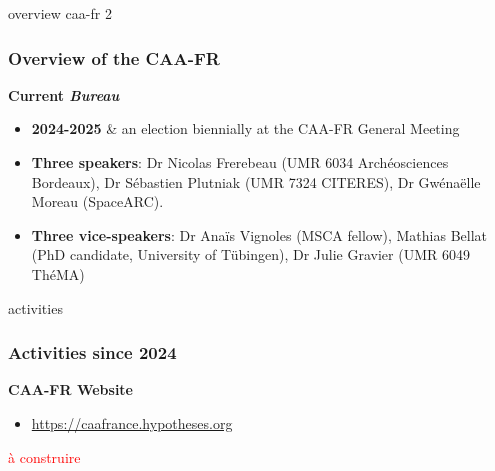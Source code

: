 \documentclass[t,aspectratio=169,xcolor=dvipsnames]{beamer}
\begin{document}
    \begin{frame}{overview caa-fr 2}

    \frametitle{Overview of the CAA-FR} 
        \begin{block}{\textbf{Current \textit{Bureau}}}
       
        \begin{itemize}
            \item \textbf{2024-2025} \& an election biennially at the CAA-FR General Meeting
            \item \textbf{Three speakers}: Dr Nicolas Frerebeau (UMR 6034 Archéosciences Bordeaux), Dr Sébastien Plutniak (UMR 7324 CITERES), Dr Gwénaëlle Moreau (SpaceARC).%
            \item \textbf{Three vice-speakers}: Dr Anaïs Vignoles (MSCA fellow), Mathias Bellat (PhD candidate, University of Tübingen), Dr Julie Gravier (UMR 6049 ThéMA)
        \end{itemize}

    \end{block}
    
    \end{frame}


\begin{frame}{activities}
	
	\frametitle{Activities since 2024}
	
	\begin{block}{\textbf{CAA-FR Website}}
		
		\begin{itemize}
			\item \href{https://caafrance.hypotheses.org}{https://caafrance.hypotheses.org}
		\end{itemize}
		
	\end{block}
	
	\textcolor{red}{à construire}
	
\end{frame}

\end{document}
